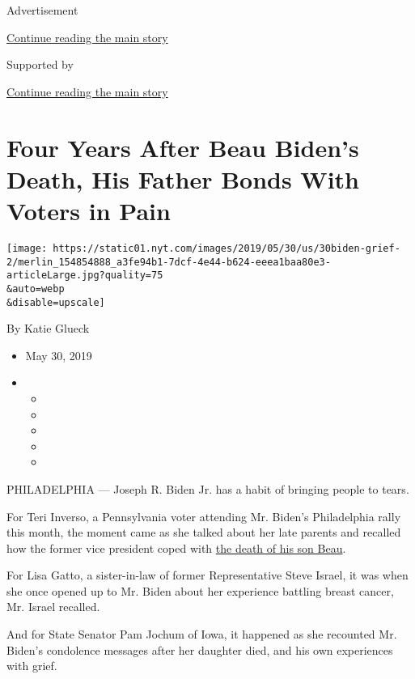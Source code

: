 Advertisement

\protect\hyperlink{after-top}{Continue reading the main story}

Supported by

\protect\hyperlink{after-sponsor}{Continue reading the main story}

\hypertarget{four-years-after-beau-bidens-death-his-father-bonds-with-voters-in-pain}{%
\section{Four Years After Beau Biden's Death, His Father Bonds With
Voters in
Pain}\label{four-years-after-beau-bidens-death-his-father-bonds-with-voters-in-pain}}

\texttt{[image: https://static01.nyt.com/images/2019/05/30/us/30biden-grief-2/merlin\_154854888\_a3fe94b1-7dcf-4e44-b624-eeea1baa80e3-articleLarge.jpg?quality=75\\\&auto=webp\\\&disable=upscale]}

By Katie Glueck

\begin{itemize}
\item
  May 30, 2019
\item
  \begin{itemize}
  \item
  \item
  \item
  \item
  \item
  \end{itemize}
\end{itemize}

PHILADELPHIA --- Joseph R. Biden Jr. has a habit of bringing people to
tears.

For Teri Inverso, a Pennsylvania voter attending Mr. Biden's
Philadelphia rally this month, the moment came as she talked about her
late parents and recalled how the former vice president coped with
\href{https://www.nytimes.com/2015/05/31/us/politics/joseph-r-biden-iii-vice-presidents-son-beau-dies-at-46.html}{the
death of his son Beau}.

For Lisa Gatto, a sister-in-law of former Representative Steve Israel,
it was when she once opened up to Mr. Biden about her experience
battling breast cancer, Mr. Israel recalled.

And for State Senator Pam Jochum of Iowa, it happened as she recounted
Mr. Biden's condolence messages after her daughter died, and his own
experiences with grief.

